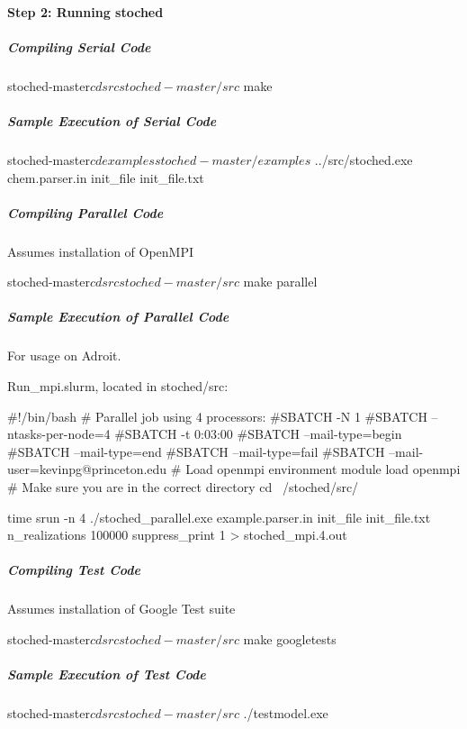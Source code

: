 \paragraph*{Step 2\+: Running stoched}

\subparagraph*{Compiling Serial Code}

\begin{DoxyVerb}stoched-master$ cd src
stoched-master/src$ make
\end{DoxyVerb}


\subparagraph*{Sample Execution of Serial Code}

\begin{DoxyVerb}stoched-master$ cd examples
stoched-master/examples$ ../src/stoched.exe chem.parser.in init_file init_file.txt
\end{DoxyVerb}


\subparagraph*{Compiling Parallel Code}

Assumes installation of Open\+M\+PI \begin{DoxyVerb}stoched-master$ cd src
stoched-master/src$ make parallel
\end{DoxyVerb}


\subparagraph*{Sample Execution of Parallel Code}

For usage on Adroit.

Run\+\_\+mpi.\+slurm, located in stoched/src\+: \begin{DoxyVerb}#!/bin/bash
# Parallel job using 4 processors:
#SBATCH -N 1 
#SBATCH --ntasks-per-node=4
#SBATCH -t 0:03:00
#SBATCH --mail-type=begin
#SBATCH --mail-type=end
#SBATCH --mail-type=fail
#SBATCH --mail-user=kevinpg@princeton.edu 
# Load openmpi environment 
module load openmpi
# Make sure you are in the correct directory
cd ~/stoched/src/

time srun -n 4 ./stoched_parallel.exe example.parser.in init_file init_file.txt n_realizations 100000 suppress_print 1 > stoched_mpi.4.out
\end{DoxyVerb}


\subparagraph*{Compiling Test Code}

Assumes installation of Google Test suite \begin{DoxyVerb}stoched-master$ cd src
stoched-master/src$ make googletests
\end{DoxyVerb}


\subparagraph*{Sample Execution of Test Code}

\begin{DoxyVerb}stoched-master$ cd src
stoched-master/src$ ./testmodel.exe
\end{DoxyVerb}


